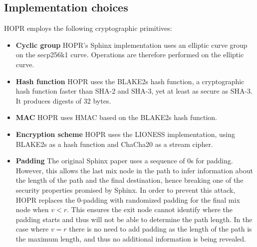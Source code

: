 \subsection{Implementation choices}

HOPR employs the following cryptographic primitives:

\begin{itemize}
    \item \textbf{Cyclic group} HOPR's Sphinx implementation uses an elliptic curve group on the secp256k1 curve. Operations are therefore performed on the elliptic curve.

    \item \textbf{Hash function} HOPR uses the BLAKE2s hash function, a cryptographic hash function faster than SHA-2 and SHA-3, yet at least as secure as SHA-3. It produces digests of 32 bytes.

    \item \textbf{MAC} HOPR uses HMAC based on the BLAKE2s hash function.

    \item \textbf{Encryption scheme} HOPR uses the LIONESS \cite{lionesspaper} implementation, using BLAKE2s as a hash function and ChaCha20 as a stream cipher.

    \item \textbf{Padding} The original Sphinx paper uses a sequence of 0s for padding. However, this allows the last mix node in the path to infer information about the length of the path and the final destination, hence breaking one of the security properties promised by Sphinx. In order to prevent this attack, HOPR replaces the 0-padding with randomized padding for the final mix node when $v<r$. This ensures the exit node cannot identify where the padding starts and thus will not be able to determine the path length. In the case where $v=r$ there is no need to add padding as the length of the path is the maximum length, and thus no additional information is being revealed.

\end{itemize}
